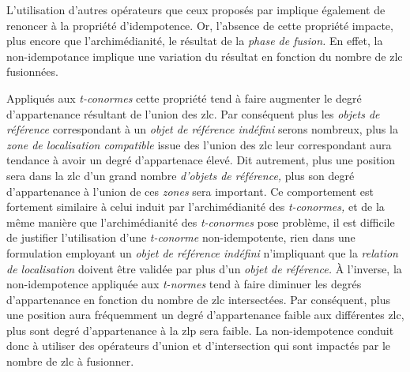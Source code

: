 L'utilisation d'autres opérateurs que ceux proposés par
\textcite{Zadeh1965} implique également de renoncer à la propriété
d'idempotence. Or, l'absence de cette propriété impacte, plus encore
que l'archimédianité, le résultat de la \emph{phase de fusion.} En
effet, la non-idempotance implique une variation du résultat en
fonction du nombre de \ac{zlc} fusionnées.

Appliqués aux \emph{t-conormes} cette propriété tend à faire augmenter
le degré d’appartenance résultant de l'union des \ac{zlc}. Par
conséquent plus les \emph{objets de référence} correspondant à un
\emph{objet de référence indéfini} serons nombreux, plus la \emph{zone
  de localisation compatible} issue des l'union des \ac{zlc} leur
correspondant aura tendance à avoir un degré d'appartenace élevé. Dit
autrement, plus une position sera dans la \ac{zlc} d'un grand nombre
\emph{d'objets de référence,} plus son degré d'appartenance à l'union
de ces \emph{zones} sera important. Ce comportement est fortement
similaire à celui induit par l'archimédianité des \emph{t-conormes,}
et de la même manière que l'archimédianité des \emph{t-conormes} pose
problème, il est difficile de justifier l'utilisation d'une
\emph{t-conorme} non-idempotente, rien dans une formulation employant
un \emph{objet de référence indéfini} n'impliquant que la
\emph{relation de localisation} doivent être validée par plus d'un
\emph{objet de référence.} À l'inverse, la non-idempotence appliquée
aux \emph{t-normes} tend à faire diminuer les degrés d'appartenance en
fonction du nombre de \ac{zlc} intersectées. Par conséquent, plus une
position aura fréquemment un degré d'appartenance faible aux
différentes \ac{zlc}, plus sont degré d'appartenance à la \ac{zlp}
sera faible. La non-idempotence conduit donc à utiliser des opérateurs
d'union et d'intersection qui sont impactés par le nombre de \ac{zlc}
à fusionner.

